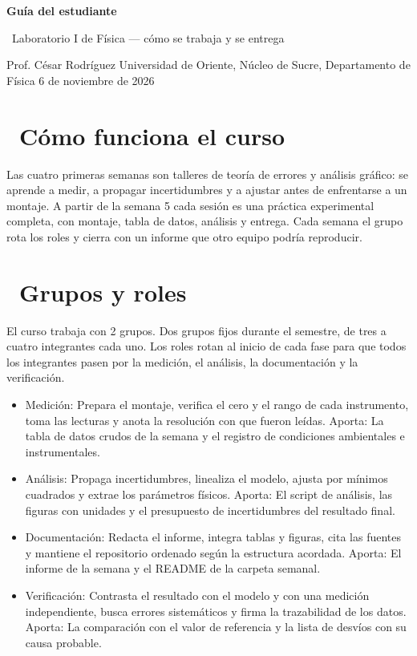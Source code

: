 \documentclass[11pt,a4paper]{article}
\newcommand{\iconoBanda}{microchip}
\newcommand{\bandaTitulo}[3][fondoOscuro]{%
  \begin{tcolorbox}[
    enhanced,
    colback=#1, colframe=#1,
    boxrule=0pt, arc=8pt, outer arc=8pt,
    width=\linewidth,
    top=18pt, bottom=6pt, left=14pt, right=14pt,
    borderline south={3.5pt}{0pt}{cyanNeon},
  ]
    \begin{minipage}[c]{0.07\linewidth}
      \centering
      \textcolor{cyanNeon}{\fontsize{30}{30}\selectfont\faIcon{\iconoBanda}}
    \end{minipage}%
    \hspace{8pt}%
    \begin{minipage}[c]{0.88\linewidth}
      {\fontsize{20}{24}\selectfont\bfseries\color{white}#2}\par\vspace{5pt}%
      \textcolor{cyanNeon!80!white}{\small\faIcon{angle-right}~#3}%
    \end{minipage}
    \vspace{4pt}
  \end{tcolorbox}%
  \vspace{8pt}%
}
\newcommand{\iconotexto}[2]{\textcolor{cyanNeon}{\faIcon{#1}}~#2}
\renewcommand{\iconoBanda}{flask}
\begin{document}
\bandaTitulo[fondoOscuro]{Guía del estudiante}{Laboratorio I de Física --- cómo se trabaja y se entrega}

\begin{center}\small\color{grisTexto}Prof. César Rodríguez \textbar{} Universidad de Oriente, Núcleo de Sucre, Departamento de Física \textbar{} 6 de noviembre de 2026\end{center}

\section{\iconotexto{info-circle}{Cómo funciona el curso}}

Las cuatro primeras semanas son talleres de teoría de errores y análisis gráfico: se aprende a medir, a propagar incertidumbres y a ajustar antes de enfrentarse a un montaje. A partir de la semana 5 cada sesión es una práctica experimental completa, con montaje, tabla de datos, análisis y entrega. Cada semana el grupo rota los roles y cierra con un informe que otro equipo podría reproducir.

\section{\iconotexto{users}{Grupos y roles}}

El curso trabaja con 2 grupos. Dos grupos fijos durante el semestre, de tres a cuatro integrantes cada uno. Los roles rotan al inicio de cada fase para que todos los integrantes pasen por la medición, el análisis, la documentación y la verificación.

\begin{itemize}[leftmargin=1.4em,itemsep=2pt,topsep=3pt]
  \item Medición: Prepara el montaje, verifica el cero y el rango de cada instrumento, toma las lecturas y anota la resolución con que fueron leídas. Aporta: La tabla de datos crudos de la semana y el registro de condiciones ambientales e instrumentales.
  \item Análisis: Propaga incertidumbres, linealiza el modelo, ajusta por mínimos cuadrados y extrae los parámetros físicos. Aporta: El script de análisis, las figuras con unidades y el presupuesto de incertidumbres del resultado final.
  \item Documentación: Redacta el informe, integra tablas y figuras, cita las fuentes y mantiene el repositorio ordenado según la estructura acordada. Aporta: El informe de la semana y el README de la carpeta semanal.
  \item Verificación: Contrasta el resultado con el modelo y con una medición independiente, busca errores sistemáticos y firma la trazabilidad de los datos. Aporta: La comparación con el valor de referencia y la lista de desvíos con su causa probable.
\end{itemize}
\end{document}

